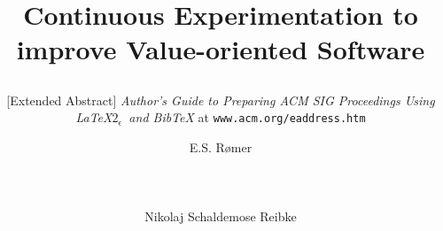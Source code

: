 \documentclass{sig-alternate}
\begin{document}
\title{Continuous Experimentation to improve Value-oriented Software
\subtitle{[Extended Abstract]
\textit{Author's Guide to Preparing ACM SIG Proceedings Using
\LaTeX$2_\epsilon$\ and BibTeX} at
\texttt{www.acm.org/eaddress.htm}}}
%
%
%
%
%

%
\author{
%
%
\alignauthor
E.S. R{\o}mer\\
       \\
       \\
       \\
\alignauthor
Nikolaj Schaldemose Reibke\\
       \\
       \\
       \\
}
\end{document}
